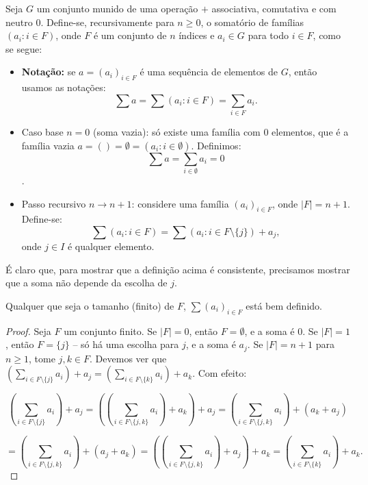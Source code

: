 \begin{definition}\label{def:group_sum}
Seja $G$ um conjunto munido de uma operação $+$ associativa, comutativa e com neutro $0$.
Define-se, recursivamente para $n\geq 0$, o somatório de famílias $(a_i: i \in F)$, onde $F$ é um conjunto de $n$ índices e $a_i \in G$ para todo $i \in F$, como se segue:

\begin{itemize}
    \item \textbf{Notação:} se $a=(a_i)_{i\in F}$ é uma sequência de elementos de $G$, então usamos as notações:
    \[\sum a=\sum(a_i: i\in F)=\sum_{i\in F} a_i.\]
    \item Caso base $n=0$ (soma vazia): só existe uma família com $0$ elementos, que é a família vazia $a=()=\emptyset=(a_i:i\in \emptyset)$.
    Definimos: \[\sum a=\sum_{i \in \emptyset}a_i=0\].
    \item Passo recursivo $n\rightarrow n+1$: considere uma família $(a_i)_{i\in F}$, onde $|F|=n+1$.
    Define-se:
    \[\sum(a_i: i \in F)=\sum(a_i: i \in F\setminus\{j\})+a_j,\]
    onde $j \in I$ é qualquer elemento.
\end{itemize}
\end{definition}
É claro que, para mostrar que a definição acima é consistente, precisamos mostrar que a soma não depende da escolha de $j$.

\begin{lemma}
Qualquer que seja o tamanho (finito) de $F$, $\sum(a_i)_{i\in F}$ está bem definido.
\end{lemma}

\begin{proof}
    Seja $F$ um conjunto finito.
Se $|F|=0$, então $F=\emptyset$, e a soma é $0$.
Se $|F|=1$, então $F=\{j\}$ -- só há uma escolha para $j$, e a soma é $a_j$.
    Se $|F|=n+1$ para $n\geq 1$, tome $j, k \in F$.
    Devemos ver que $\left(\sum_{i\in F\setminus\{j\}} a_i\right)+a_j=\left(\sum_{i\in F\setminus\{k\}} a_i\right)+a_k$.
    Com efeito:

    \[\left(\sum_{i\in F\setminus\{j\}} a_i\right)+a_j=\left(\left(\sum_{i\in F\setminus\{j, k\}} a_i\right)+a_k\right)+a_j=\left(\sum_{i\in F\setminus\{j, k\}} a_i\right)+(a_k+a_j)\]

    \[=\left(\sum_{i\in F\setminus\{j, k\}} a_i\right)+(a_j+a_k)=\left(\left(\sum_{i\in F\setminus\{j, k\}} a_i\right)+a_j\right)+a_k=\left(\sum_{i\in F\setminus\{k\}} a_i\right)+a_k.\]
\end{proof}

